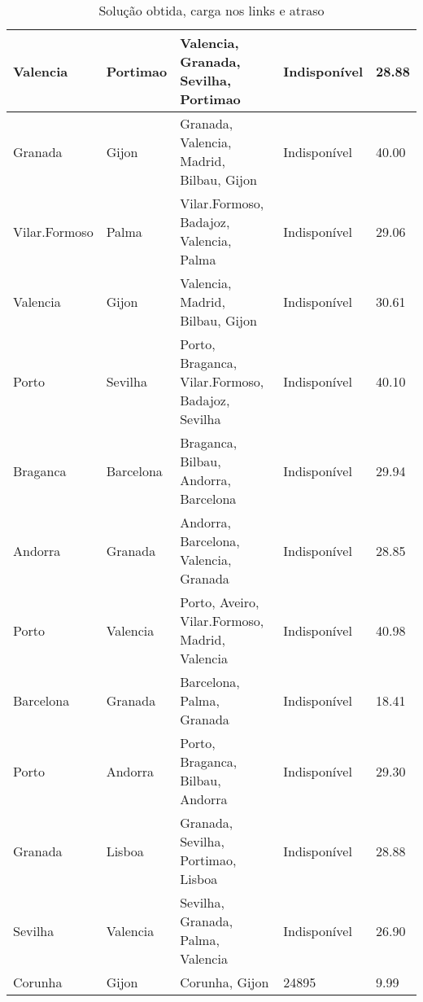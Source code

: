 \begin{table}[!htb]
{\begin{tabular}{|l|l|l|l|l|}
Valencia & Portimao & Valencia, Granada, Sevilha, Portimao & Indisponível & 28.88 \\ \hline
Granada & Gijon & Granada, Valencia, Madrid, Bilbau, Gijon & Indisponível & 40.00 \\ \hline
Vilar.Formoso & Palma & Vilar.Formoso, Badajoz, Valencia, Palma & Indisponível & 29.06 \\ \hline
Valencia & Gijon & Valencia, Madrid, Bilbau, Gijon & Indisponível & 30.61 \\ \hline
Porto & Sevilha & Porto, Braganca, Vilar.Formoso, Badajoz, Sevilha & Indisponível & 40.10 \\ \hline
Braganca & Barcelona & Braganca, Bilbau, Andorra, Barcelona & Indisponível & 29.94 \\ \hline
Andorra & Granada & Andorra, Barcelona, Valencia, Granada & Indisponível & 28.85 \\ \hline
Porto & Valencia & Porto, Aveiro, Vilar.Formoso, Madrid, Valencia & Indisponível & 40.98 \\ \hline
Barcelona & Granada & Barcelona, Palma, Granada & Indisponível & 18.41 \\ \hline
Porto & Andorra & Porto, Braganca, Bilbau, Andorra & Indisponível & 29.30 \\ \hline
Granada & Lisboa & Granada, Sevilha, Portimao, Lisboa & Indisponível & 28.88 \\ \hline
Sevilha & Valencia & Sevilha, Granada, Palma, Valencia & Indisponível & 26.90 \\ \hline
Corunha & Gijon & Corunha, Gijon & 24895 & 9.99 \\ \hline
\end{tabular}}
\caption[]{Solução obtida, carga nos links e atraso}
\end{table}

\begin{table}[!htb]
        \centering
\caption[]{Solução obtida, carga nos links e atraso}
\end{table}


